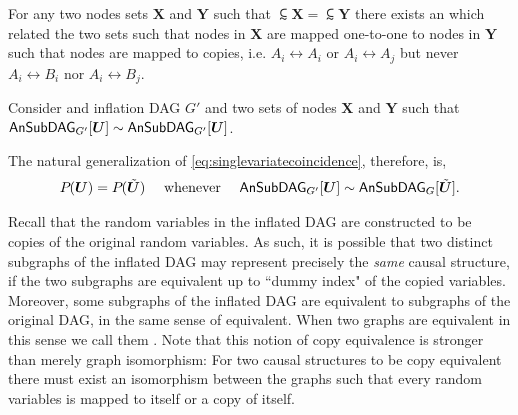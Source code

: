 \begin{asparadesc}
For any two nodes sets $\bm{X}$ and $\bm{Y}$ such that $\subsim{\bm{X}}=\subsim{\bm{Y}}$ there exists an  which related the two sets such that nodes in $\bm{X}$ are mapped one-to-one to nodes in $\bm{Y}$ such that nodes are mapped to copies, i.e. $A_i\leftrightarrow A_i$ or $A_i\leftrightarrow A_j$ but never $A_i\leftrightarrow B_i$ nor  $A_i\leftrightarrow B_j$.



Consider and inflation DAG $G'$ and two sets of nodes $\bm{X}$ and $\bm{Y}$ such that $\ansubgraph[G']{\bm{U}}\sim\ansubgraph[G']{\bm{U}}$.


The natural generalization of \cref{eq:singlevariatecoincidence}, therefore, is,
\begin{align}\label{eq:coincidingdistrodef}
\pdf{\bm{U}}=\pdf{\subsim{\bm{U}}} \quad\text{ whenever }\quad\ansubgraph[G']{\bm{U}}\sim\ansubgraph[G]{\subsim{\bm{U}}}.
\end{align}

Recall that the random variables in the inflated DAG are constructed to be copies of the original random variables. As such, it is possible that two distinct subgraphs of the inflated DAG may represent precisely the \emph{same} causal structure, if the two subgraphs are equivalent up to ``dummy index" of the copied variables. Moreover, some subgraphs of the inflated DAG are equivalent to subgraphs of the original DAG, in the same sense of equivalent. When two graphs are equivalent in this sense we call them . Note that this notion of copy equivalence is stronger than merely graph isomorphism: For two causal structures to be copy equivalent there must exist an isomorphism between the graphs such that every random variables is mapped to itself or a copy of itself. 


\end{asparadesc}
